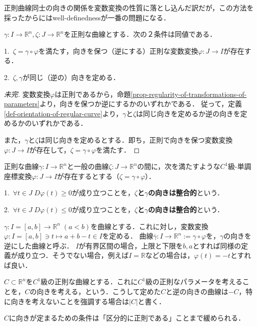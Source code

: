 \documentclass[uplatex, dvipdfmx]{jsreport}
\begin{document}
正則曲線同士の向きの関係を変数変換の性質に落とし込んだ訳だが，この方法を採ったからにはwell-definednessが一番の問題になる．

\begin{proposition}
    $\gamma:I\to\mathbb{R}^n, \zeta:J\to\mathbb{R}^n$を正則な曲線とする．次の２条件は同値である．
    
    1.\, $\zeta=\gamma\circ\varphi$を満たす，向きを保つ（逆にする）正則な変数変換$\varphi:J\to I$が存在する．

    2.\, $\zeta,\gamma$が同じ（逆の）向きを定める．
\end{proposition}
\begin{proof}[未完]
    変数変換$\varphi$は正則であるから，命題\ref{prop-regularity-of-transformations-of-parameters}より，向きを保つか逆にするかのいずれかである．
    従って，定義\ref{def-orientation-of-regular-curve}より，$\gamma$と$\zeta$は同じ向きを定めるか逆の向きを定めるかのいずれかである．

    また，$\gamma$と$\zeta$は同じ向きを定めるとする．即ち，正則で向きを保つ変数変換$\varphi:J\to I$が存在して，$\zeta=\gamma\circ\varphi$を満たす．
\end{proof}

\begin{definition}\rm{}
    正則な曲線$\gamma:I\to\mathbb{R}^n$と一般の曲線$\zeta:J\to\mathbb{R}^n$の間に，次を満たすような$C^1$級-単調座標変換$\varphi:J\to I$が存在するとする（$\zeta =\gamma\circ\varphi$）．

    1.\, $\forall t\in J \; D\varphi (t)\ge 0$が成り立つことを，\textbf{$\zeta$と$\gamma$の向きは整合的}という．

    2.\, $\forall t\in J \; D\varphi (t)\le 0$が成り立つことを，\textbf{$\zeta$と$\gamma$の向きは整合的}という．
\end{definition}

\begin{definition}[逆向きの曲線]
    $\gamma:I=[a,b]\to\mathbb{R}^n\;(a<b)$を曲線とする．これに対し，変数変換$\varphi:I=[a,b]\ni t\mapsto a+b-t\in I$を定める．
    曲線$\overline{\gamma}:I\to\mathbb{R}^n :=\gamma\circ\varphi$を，$\gamma$の向きを逆にした曲線と呼ぶ．
    $I$が有界区間の場合，上限と下限を$b,a$とすれば同様の定義が成り立つ．そうでない場合，例えば$I=\mathbb{R}$などの場合は，$\varphi(t)=-t$とすれば良い．
\end{definition}
\begin{notation}
    $C\subset\mathbb{R}^n$を$C^1$級の正則な曲線とする．これに$C^1$級の正則なパラメータを考えることを，$C$の向きを考える，という．こうして定めた$C$と逆の向きの曲線は$-C$，特に向きを考えないことを強調する場合は$|C|$と書く．

    $C$に向きが定まるための条件は「区分的に正則である」ことまで緩められる．
\end{notation}
\end{document}
